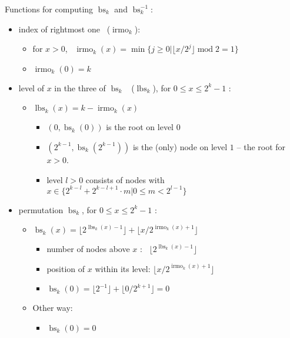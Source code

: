 \documentclass{letter}
\newcommand{\tmop}[1]{\ensuremath{\operatorname{#1}}}
\begin{document}
Functions for computing $\tmop{bs}_k$ and $\tmop{bs}_k^{- 1}$:
\begin{itemize}
  \item index of rightmost one \ ($\tmop{irmo}_k$):
  \begin{itemize}
    \item for $x > 0$, \ $\tmop{irmo}_k (x) = \min \{j \geq 0| \lfloor x / 2^j
    \rfloor \tmop{mod} 2 = 1\}$
    
    \item $\tmop{irmo}_k (0) = k$
  \end{itemize}
  \item level of $x$ in the three of $\tmop{bs}_k$ \ ($\tmop{lbs}_k$), for $0
  \leqslant x \leqslant 2^k - 1$ :
  \begin{itemize}
    \item $\tmop{lbs}_k (x) = k - \tmop{irmo}_k (x)$
    \begin{itemize}
      \item $(0, \tmop{bs}_k (0))$ is the root on level $0$
      
      \item $(2^{k - 1}, \tmop{bs}_k (2^{k - 1}))$ is the (only) node on level
      $1$ -- the root for $x > 0$.
      
      \item level $l > 0$ consists of nodes with $x \in \{2^{k - l} + 2^{k - l
      + 1} \cdot m | 0 \leqslant m < 2^{l - 1} \}$
    \end{itemize}
  \end{itemize}
  \item permutation $\tmop{bs}_k$, for $0 \leqslant x \leqslant 2^k - 1$ :
  \begin{itemize}
    \item $\tmop{bs}_k (x) = \lfloor 2^{\tmop{lbs}_k (x) - 1} \rfloor +
    \lfloor x / 2^{\tmop{irmo}_k (x) + 1} \rfloor$
    \begin{itemize}
      \item number of nodes above $x$ : \ $\lfloor 2^{\tmop{lbs}_k (x) - 1}
      \rfloor$
      
      \item position of $x$ within its level: $\lfloor x / 2^{\tmop{irmo}_k
      (x) + 1} \rfloor$
      
      \item $\tmop{bs}_k (0) = \lfloor 2^{- 1} \rfloor + \lfloor 0 / 2^{k + 1}
      \rfloor = 0$
    \end{itemize}
    \item Other way:
    \begin{itemize}
      \item $\tmop{bs}_k (0) = 0$
      

\end{itemize}
\end{itemize}
\end{itemize}
\end{document}
